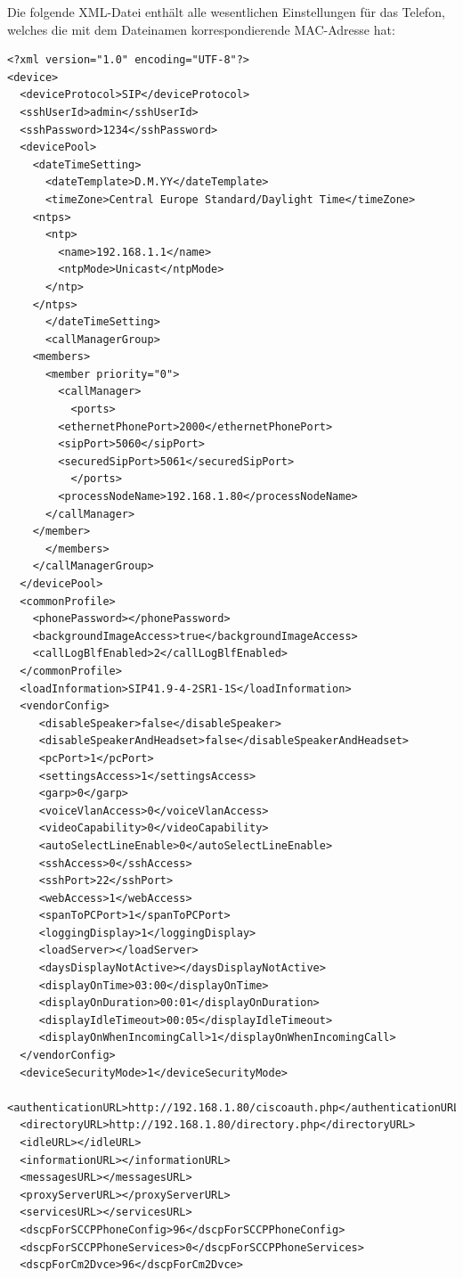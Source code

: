 \documentclass[a4paper,12pt]{scrbook}
\begin{document}
Die folgende XML-Datei enthält alle wesentlichen Einstellungen für das Telefon, welches die mit dem Dateinamen korrespondierende MAC-Adresse hat:
\begin{lstlisting}[caption={SEP\textbf{0012345678DE}.cnf.xml}, label=lst:cisco7961sep0012345678decnfxml]               
<?xml version="1.0" encoding="UTF-8"?>
<device>
  <deviceProtocol>SIP</deviceProtocol>
  <sshUserId>admin</sshUserId>
  <sshPassword>1234</sshPassword>
  <devicePool>
    <dateTimeSetting>
      <dateTemplate>D.M.YY</dateTemplate>
      <timeZone>Central Europe Standard/Daylight Time</timeZone>
	<ntps>
	  <ntp>
	    <name>192.168.1.1</name>
	    <ntpMode>Unicast</ntpMode>
	  </ntp>
	</ntps>
      </dateTimeSetting>
      <callManagerGroup>
	<members>
	  <member priority="0">
	    <callManager>
	      <ports>
		<ethernetPhonePort>2000</ethernetPhonePort>
		<sipPort>5060</sipPort>
		<securedSipPort>5061</securedSipPort>
	      </ports>
	    <processNodeName>192.168.1.80</processNodeName>
	  </callManager>
	</member>
      </members>
    </callManagerGroup>
  </devicePool>
  <commonProfile>
    <phonePassword></phonePassword>
    <backgroundImageAccess>true</backgroundImageAccess>
    <callLogBlfEnabled>2</callLogBlfEnabled>
  </commonProfile>
  <loadInformation>SIP41.9-4-2SR1-1S</loadInformation>
  <vendorConfig>
     <disableSpeaker>false</disableSpeaker>
     <disableSpeakerAndHeadset>false</disableSpeakerAndHeadset>
     <pcPort>1</pcPort>
     <settingsAccess>1</settingsAccess>
     <garp>0</garp>
     <voiceVlanAccess>0</voiceVlanAccess>
     <videoCapability>0</videoCapability>
     <autoSelectLineEnable>0</autoSelectLineEnable>
     <sshAccess>0</sshAccess>
     <sshPort>22</sshPort>
     <webAccess>1</webAccess>
     <spanToPCPort>1</spanToPCPort>
     <loggingDisplay>1</loggingDisplay>
     <loadServer></loadServer>
     <daysDisplayNotActive></daysDisplayNotActive>
     <displayOnTime>03:00</displayOnTime>
     <displayOnDuration>00:01</displayOnDuration>
     <displayIdleTimeout>00:05</displayIdleTimeout>
     <displayOnWhenIncomingCall>1</displayOnWhenIncomingCall>
  </vendorConfig>
  <deviceSecurityMode>1</deviceSecurityMode>
  <authenticationURL>http://192.168.1.80/ciscoauth.php</authenticationURL>
  <directoryURL>http://192.168.1.80/directory.php</directoryURL>
  <idleURL></idleURL>
  <informationURL></informationURL>
  <messagesURL></messagesURL>
  <proxyServerURL></proxyServerURL>
  <servicesURL></servicesURL>
  <dscpForSCCPPhoneConfig>96</dscpForSCCPPhoneConfig>
  <dscpForSCCPPhoneServices>0</dscpForSCCPPhoneServices>
  <dscpForCm2Dvce>96</dscpForCm2Dvce>

\end{lstlisting}
\end{document}
